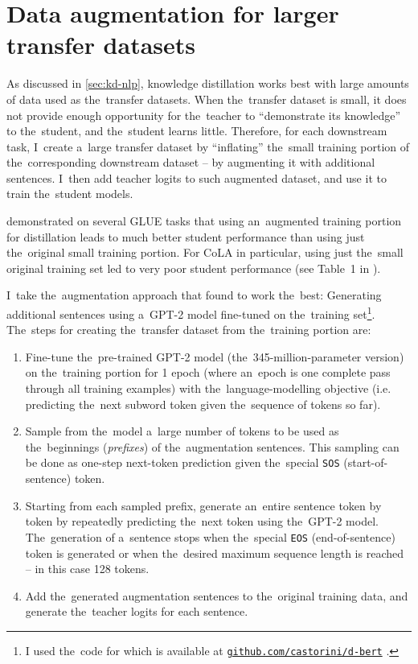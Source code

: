 \documentclass[bsc,frontabs,singlespacing,parskip,deptreport]{infthesis}
\newcommand\rurl[1]{%
  \href{https://#1}{\nolinkurl{#1}}%
}
\begin{document}
{  \section{Data augmentation for larger transfer datasets}{
    \label{sec:augmentation}
    As discussed in \autoref{sec:kd-nlp}, knowledge distillation works best with large amounts of data used as the~transfer datasets. When the~transfer dataset is small, it does not provide enough opportunity for the~teacher to ``demonstrate its knowledge'' to the~student, and the~student learns little. Therefore, for each downstream task, I~create a~large transfer dataset by ``inflating'' the~small training portion of the~corresponding downstream dataset -- by augmenting it with additional sentences. I~then add teacher logits to such augmented dataset, and use it to train the~student models.

    \citet{Tang_2019b} demonstrated on several GLUE tasks that using an~augmented training portion for distillation leads to much better student performance than using just the~original small training portion.
    For CoLA in particular, using just the~small original training set led to very poor student performance (see Table~1 in \citeauthor{Tang_2019b}).
    
    I~take the~augmentation approach that \citeauthor{Tang_2019b} found to work the~best: Generating additional sentences using a~GPT-2 model \citep{Radford_2019} fine-tuned on the~training set\footnote{I used the~code for \citet{Tang_2019b} which is available at \rurl{github.com/castorini/d-bert}.}. The~steps for creating the~transfer dataset from the~training portion are:
    \begin{enumerate}
      \item Fine-tune the~pre-trained GPT-2 model (the~345-million-parameter version) on the~training portion for 1 epoch (where an~epoch is one complete pass through all training examples) with the~language-modelling objective (i.e. predicting the~next subword token given the~sequence of tokens so far).
      \item Sample from the~model a~large number of tokens to be used as the~beginnings (\textit{prefixes}) of the~augmentation sentences. This sampling can be done as one-step next-token prediction given the~special \verb|SOS| (start-of-sentence) token.
      \item Starting from each sampled prefix, generate an~entire sentence token by token by repeatedly predicting the~next token using the~GPT-2 model. The~generation of a~sentence stops when the~special \verb|EOS| (end-of-sentence) token is generated or when the~desired maximum sequence length is reached -- in this case 128 tokens.
      \item Add the~generated augmentation sentences to the~original training data, and generate the~teacher logits for each sentence.
    \end{enumerate}

}}
\end{document}
